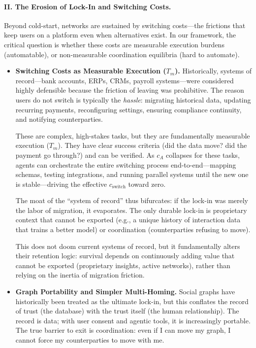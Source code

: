 \documentclass[12pt, letter]{article}
\begin{document}
\paragraph{II. The Erosion of Lock-In and Switching Costs.} Beyond cold-start, networks are sustained by switching costs---the frictions that keep users on a platform even when alternatives exist. In our framework, the critical question is whether these costs are measurable execution burdens (automatable), or non-measurable coordination equilibria (hard to automate).

\begin{itemize}
    \item \textbf{Switching Costs as Measurable Execution ($T_m$).} Historically, systems of record---bank accounts, ERPs, CRMs, payroll systems---were considered highly defensible because the friction of leaving was prohibitive. The reason users do not switch is typically the \textit{hassle}: migrating historical data, updating recurring payments, reconfiguring settings, ensuring compliance continuity, and notifying counterparties.

    These are complex, high-stakes tasks, but they are fundamentally measurable execution ($T_m$). They have clear success criteria (did the data move? did the payment go through?) and can be verified. As $c_A$ collapses for these tasks, agents can orchestrate the entire switching process end-to-end—mapping schemas, testing integrations, and running parallel systems until the new one is stable—driving the effective $c_{\text{switch}}$ toward zero. 

    The moat of the ``system of record'' thus bifurcates: if the lock-in was merely the labor of migration, it evaporates. The only durable lock-in is proprietary context that cannot be exported (e.g., a unique history of interaction data that trains a better model) or coordination (counterparties refusing to move).

    This does not doom current systems of record, but it fundamentally alters their retention logic: survival depends on continuously adding value that cannot be exported (proprietary insights, active networks), rather than relying on the inertia of migration friction.

    \item \textbf{Graph Portability and Simpler Multi-Homing.} Social graphs have historically been treated as the ultimate lock-in, but this conflates the record of trust (the database) with the trust itself (the human relationship). The record is data; with user consent and agentic tools, it is increasingly portable. The true barrier to exit is coordination: even if I can move my graph, I cannot force my counterparties to move with me.


\end{itemize}
\end{document}
